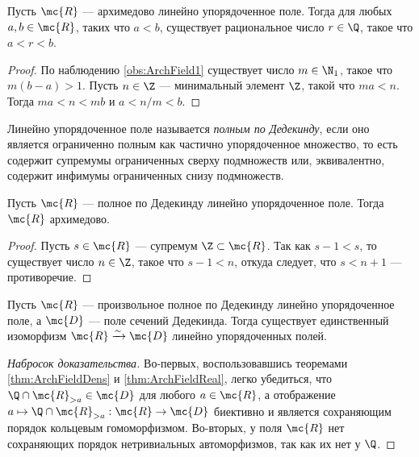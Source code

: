 \documentclass[
	extrafontsizes,
	11pt,
	hyphens,
]{memoir}
\begin{document}
\begin{theorem}
\label{thm:ArchFieldDens}
Пусть \(\mc{R}\) --- архимедово линейно упорядоченное поле.
Тогда для любых \(a, b \in \mc{R}\), таких что \(a < b\), существует рациональное число \(r \in \Q\), такое что \(a < r < b\).
\end{theorem}

\begin{proof}
По наблюдению \ref{obs:ArchField1} существует число \(m \in \N_1\), такое что \(m(b-a) > 1\). Пусть \(n \in \Z\) --- минимальный элемент \(\Z\), такой что \(ma < n\). Тогда \(ma < n < mb\) и \(a < n/m < b\).
\end{proof}

\begin{definition}
Линейно упорядоченное поле называется \emph{полным по Дедекинду}, если оно является ограниченно полным как частично упорядоченное множество, то есть содержит
супремумы ограниченных сверху подмножеств или, эквивалентно, содержит инфимумы ограниченных снизу подмножеств.
\end{definition}

\begin{theorem}
\label{thm:ArchFieldReal}
Пусть \(\mc{R}\) --- полное по Дедекинду линейно упорядоченное поле.
Тогда \(\mc{R}\) архимедово.
\end{theorem}

\begin{proof}
Пусть \(s \in \mc{R}\) --- супремум \(\Z \subset \mc{R}\).
Так как \(s - 1 < s\), то существует число \(n \in \Z\), такое что \(s - 1 < n\), откуда следует, что \(s < n + 1\) --- противоречие.
\end{proof}

\begin{theorem}
Пусть \(\mc{R}\) --- произвольное полное по Дедекинду линейно упорядоченное поле,
а \(\mc{D}\) --- поле сечений Дедекинда.
Тогда существует единственный изоморфизм \(\mc{R} \xrightarrow{\sim} \mc{D}\) линейно упорядоченных полей.
\end{theorem}

\begin{proof}[Набросок доказательства]
Во-первых, воспользовавшись теоремами \ref{thm:ArchFieldDens} и \ref{thm:ArchFieldReal}, легко убедиться, что \(\Q \cap \mc{R}_{> a} \in \mc{D}\) для любого \(a \in \mc{R}\), а отображение \(a \mapsto \Q \cap \mc{R}_{> a} : \mc{R} \to \mc{D}\) биективно и является сохраняющим порядок кольцевым гомоморфизмом.
Во-вторых, у поля \(\mc{R}\) нет сохраняющих порядок нетривиальных автоморфизмов, так как их нет у \(\Q\).
\end{proof}
\end{document}
